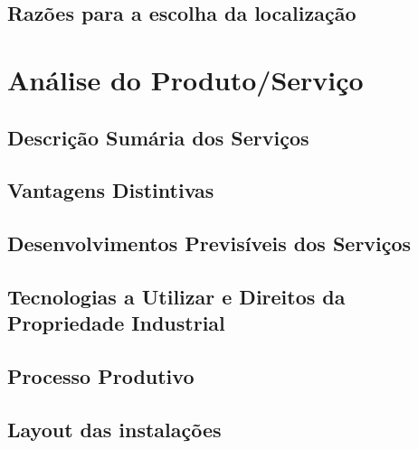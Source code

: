 \documentclass[11pt]{article}
\begin{document}
	
	\large
	\subsection{Razões para a escolha da localização}
	
	\normalsize
	
	
	\pagebreak
	
	\large
	\section{Análise do Produto/Serviço}
	
	\normalsize
	
	\large
	\subsection{Descrição Sumária dos Serviços}
	
	\normalsize
	
	
	\large
	\subsection{Vantagens Distintivas}
	
	\normalsize
	
	
	\large
	\subsection{Desenvolvimentos Previsíveis dos Serviços}
	
	\normalsize
	
	
	\large
	\subsection{Tecnologias a Utilizar e Direitos da Propriedade Industrial}
	
	\normalsize
	
	
	\large
	\subsection{Processo Produtivo}
	
	\normalsize
	
	
	\large
	\subsection{Layout das instalações}
	
	\normalsize
	
	
	\pagebreak
	
\end{document}
